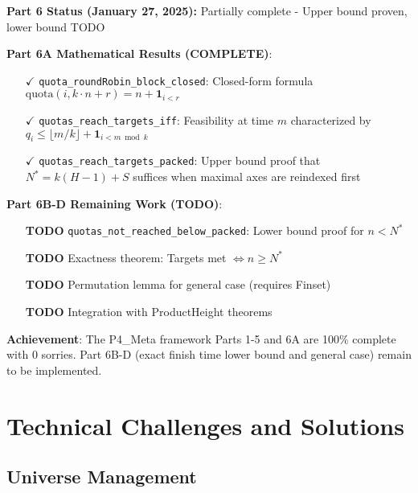 \documentclass[11pt]{article}
\theoremstyle{definition}
\theoremstyle{remark}
\begin{document}
\begin{mdframed}[style=status]
\textbf{Part 6 Status (January 27, 2025):} Partially complete - Upper bound proven, lower bound TODO
\end{mdframed}

\textbf{Part 6A Mathematical Results (COMPLETE)}:
\begin{itemize}
\item[$\checkmark$] \texttt{quota\_roundRobin\_block\_closed}: Closed-form formula $\text{quota}(i, k \cdot n + r) = n + \mathbf{1}_{i < r}$
\item[$\checkmark$] \texttt{quotas\_reach\_targets\_iff}: Feasibility at time $m$ characterized by $q_i \leq \lfloor m/k \rfloor + \mathbf{1}_{i < m \bmod k}$  
\item[$\checkmark$] \texttt{quotas\_reach\_targets\_packed}: Upper bound proof that $N^* = k(H-1) + S$ suffices when maximal axes are reindexed first
\end{itemize}

\textbf{Part 6B-D Remaining Work (TODO)}:
\begin{itemize}
\item[\textbf{TODO}] \texttt{quotas\_not\_reached\_below\_packed}: Lower bound proof for $n < N^*$
\item[\textbf{TODO}] Exactness theorem: Targets met $\Leftrightarrow n \geq N^*$
\item[\textbf{TODO}] Permutation lemma for general case (requires Finset)
\item[\textbf{TODO}] Integration with ProductHeight theorems
\end{itemize}

\begin{mdframed}[style=achievement]
\textbf{Achievement}: The P4\_Meta framework Parts 1-5 and 6A are 100\% complete with 0 sorries. Part 6B-D (exact finish time lower bound and general case) remain to be implemented.
\end{mdframed}
\section{Technical Challenges and Solutions}

\subsection{Universe Management}
\end{document}
